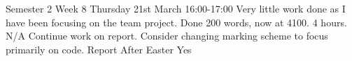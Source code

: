 \documentclass[../CHEFCookingHelper.tex]{subfiles}
\begin{document}
\logbookentry
{Semester 2 Week 8}
{Thursday 21st March 16:00-17:00}
{Very little work done as I have been focusing on the team project. Done 200 words, now at 4100.}
{4 hours.}
{N/A}
{Continue work on report. Consider changing marking scheme to focus primarily on code.}
{Report}
{After Easter}
{Yes}
\end{document}
